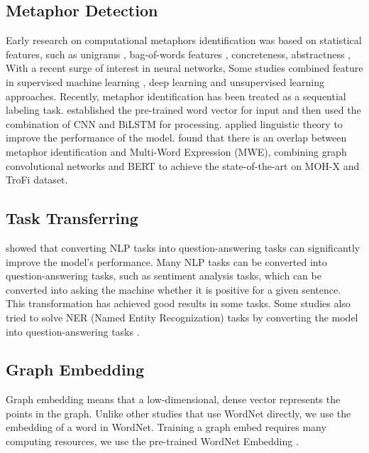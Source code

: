 \documentclass[11pt,a4paper]{article}
\begin{document}
\subsection{Metaphor Detection}
Early research on computational metaphors identification was based on statistical features, such as unigrams \cite{beigman-klebanov-etal-2014-different}, bag-of-words features \cite{koper-schulte-im-walde-2016-distinguishing}, concreteness, abstractness \cite{tsvetkov2014metaphor}, With a recent surge of interest in neural networks, Some studies combined feature in supervised machine learning \cite{turney-etal-2011-literal,beigman-klebanov-etal-2016-semantic}, deep learning \cite{rei-etal-2017-grasping,gutierrez-etal-2017-using} and unsupervised learning \cite{shutova-2015-design,mao2018word} approaches.
Recently, metaphor identification has been treated as a sequential labeling task. \citet{wu2018neural} established the pre-trained word vector for input and then used the combination of CNN and BiLSTM for processing. \citet{mao2019end} applied linguistic theory to improve the performance of the model. \citet{rohanian-etal-2020-verbal} found that there is an overlap between metaphor identification and Multi-Word Expression (MWE), combining graph convolutional networks and BERT \cite{devlin2018bert} to achieve the state-of-the-art on MOH-X and TroFi dataset.
\subsection{Task Transferring}
\citet{mccann2018natural} showed that converting NLP tasks into question-answering tasks can significantly improve the model's performance. Many NLP tasks can be converted into question-answering tasks, such as sentiment analysis tasks, which can be converted into asking the machine whether it is positive for a given sentence. This transformation has achieved good results in some tasks. Some studies also tried to solve NER (Named Entity Recognization) tasks by converting the model into question-answering tasks \cite{li2019unified}.

\subsection{Graph Embedding}
 Graph embedding means that a low-dimensional, dense vector represents the points in the graph. Unlike other studies that use WordNet directly, we use the embedding of a word in WordNet. Training a graph embed requires many computing resources, we use the pre-trained WordNet Embedding \cite{saedi2018wordnet}.
\end{document}

